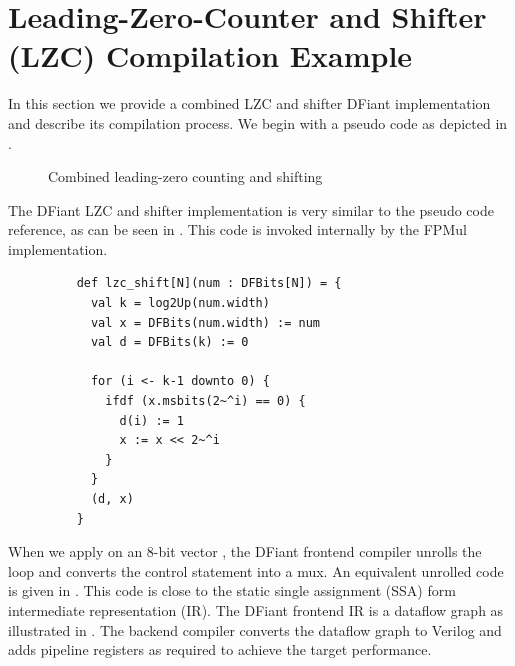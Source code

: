 \section{Leading-Zero-Counter and Shifter (LZC) Compilation Example}
\label{sec:lzc}
In this section we provide a combined LZC and shifter DFiant implementation and describe its compilation process. We begin with a pseudo code\cite{muller2009handbook} as depicted in .
\begin{figure}[h]
\begin{algorithm}[H]
  \caption*{Combined leading-zero counting and shifting}
  \begin{algorithmic}
    \small
    
    \ELSE 
    \ENDIF
    \ENDFOR
  \end{algorithmic}
\end{algorithm}
\label{fig:LZC_pseudo_code}
\end{figure}

The DFiant LZC and shifter implementation is very similar to the pseudo code reference, as can be seen in . This code is invoked internally by the FPMul implementation. 

\begin{figure}[h]
  \begin{verbatim}
    def lzc_shift[N](num : DFBits[N]) = {
      val k = log2Up(num.width)
      val x = DFBits(num.width) := num
      val d = DFBits(k) := 0
      
      for (i <- k-1 downto 0) {
        ifdf (x.msbits(2~^i) == 0) {
          d(i) := 1
          x := x << 2~^i
        }
      }
      (d, x)
    }
  \end{verbatim}
  \label{fig:LZC_DFiant_code}
\end{figure}

When we apply  on an 8-bit vector , the DFiant frontend compiler unrolls the  loop and converts the  control statement into a mux. An equivalent unrolled code is given in . This code is close to the static single assignment (SSA) form intermediate representation (IR). The DFiant frontend IR is a dataflow graph as illustrated in . The backend compiler converts the dataflow graph to Verilog and adds pipeline registers as required to achieve the target performance.

